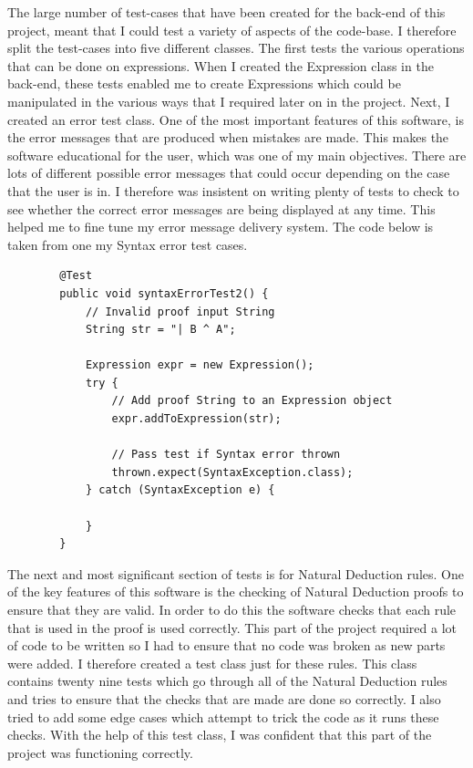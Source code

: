 The large number of test-cases that have been created for the back-end of this project, meant that I could test a variety of aspects of the code-base. I therefore split the test-cases into five different classes. The first tests the various operations that can be done on expressions. When I created the Expression class in the back-end, these tests enabled me to create Expressions which could be manipulated in the various ways that I required later on in the project. Next, I created an error test class. One of the most important features of this software, is the error messages that are produced when mistakes are made. This makes the software educational for the user, which was one of my main objectives. There are lots of different possible error messages that could occur depending on the case that the user is in. I therefore was insistent on writing plenty of tests to check to see whether the correct error messages are being displayed at any time. This helped me to fine tune my error message delivery system. The code below is taken from one my Syntax error test cases.

	\begin{lstlisting}
		@Test
		public void syntaxErrorTest2() {
			// Invalid proof input String
			String str = "| B ^ A";
	
			Expression expr = new Expression();
			try {
				// Add proof String to an Expression object
				expr.addToExpression(str);
				
				// Pass test if Syntax error thrown
				thrown.expect(SyntaxException.class);
			} catch (SyntaxException e) {
	
			}
		}
	\end{lstlisting}


The next and most significant section of tests is for Natural Deduction rules. One of the key features of this software is the checking of Natural Deduction proofs to ensure that they are valid. In order to do this the software checks that each rule that is used in the proof is used correctly. This part of the project required a lot of code to be written so I had to ensure that no code was broken as new parts were added. I therefore created a test class just for these rules. This class contains twenty nine tests which go through all of the Natural Deduction rules and tries to ensure that the checks that are made are done so correctly. I also tried to add some edge cases which attempt to trick the code as it runs these checks. With the help of this test class, I was confident that this part of the project was functioning correctly.

